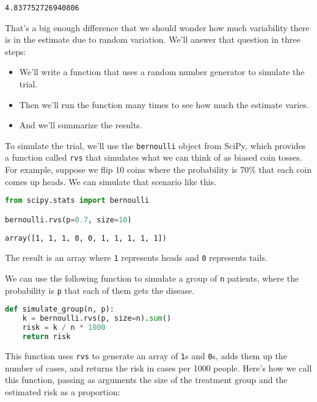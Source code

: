 \begin{lstlisting}[style=output]
4.837752726940806
\end{lstlisting}

That's a big enough difference that we should wonder how much
variability there is in the estimate due to random variation. We'll
answer that question in three steps:

\begin{itemize}
\item
  We'll write a function that uses a random number generator to simulate
  the trial.
\item
  Then we'll run the function many times to see how much the estimate
  varies.
\item
  And we'll summarize the results.
\end{itemize}

To simulate the trial, we'll use the \passthrough{\lstinline!bernoulli!}
object from SciPy, which provides a function called
\passthrough{\lstinline!rvs!} that simulates what we can think of as
biased coin tosses. For example, suppose we flip 10 coins where the
probability is 70\% that each coin comes up heads. We can simulate that
scenario like this.

\begin{lstlisting}[language=Python,style=source]
from scipy.stats import bernoulli

bernoulli.rvs(p=0.7, size=10)
\end{lstlisting}

\begin{lstlisting}[style=output]
array([1, 1, 1, 0, 0, 1, 1, 1, 1, 1])
\end{lstlisting}

The result is an array where \passthrough{\lstinline!1!} represents
heads and \passthrough{\lstinline!0!} represents tails.

\pagebreak

We can use the following function to simulate a group of
\passthrough{\lstinline!n!} patients, where the probability is
\passthrough{\lstinline!p!} that each of them gets the disease.

\begin{lstlisting}[language=Python,style=source]
def simulate_group(n, p):
    k = bernoulli.rvs(p, size=n).sum()
    risk = k / n * 1000
    return risk
\end{lstlisting}

This function uses \passthrough{\lstinline!rvs!} to generate an array of
\passthrough{\lstinline!1!}s and \passthrough{\lstinline!0!}s, adds them
up the number of cases, and returns the risk in cases per 1000 people.
Here's how we call this function, passing as arguments the size of the
treatment group and the estimated risk as a proportion:


